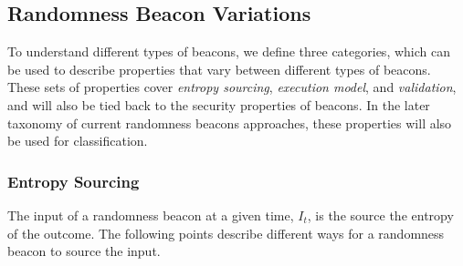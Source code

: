 \subsection{Randomness Beacon Variations}
 To understand different types of beacons, we define three categories, which can be used to describe properties that vary between different types of beacons.
These sets of properties cover \emph{entropy sourcing}, \emph{execution model}, and \emph{validation}, and will also be tied back to the security properties of beacons. 
In the later taxonomy of current randomness beacons approaches, these properties will also be used for classification.

\subsubsection{Entropy Sourcing}
The input of a randomness beacon at a given time, $I_t$, is the source the entropy of the outcome.
The following points describe different ways for a randomness beacon to source the input.
